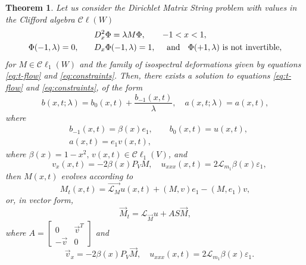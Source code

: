\documentclass[10pt,a4paper]{article}
\numberwithin{equation}{section}
\theoremstyle{plain}
\newtheorem{theorem}{Theorem}[section]
\theoremstyle{definition}
\renewcommand{\epsilon}{\varepsilon}
\newcommand\Cl{\mathcal{C}\ell}
\newcommand{\InMf}{\stackrel{\rightarrow}{\mathcal{L}_{M}}}
\renewcommand{\l}{\lambda}
\begin{document}
\begin{theorem}
Let us consider the Dirichlet Matrix String problem with values in the Clifford algebra $\Cl(W)$
\begin{align} 
&D_x^2 \Phi=\lambda M \Phi, \qquad   -1<x<1,  \\
\Phi(-1, \l)=0,  \qquad& D_x \Phi(-1, \l)=1, \quad  \text{ and \hspace{0.1cm} $\Phi(+1,\lambda)$ is not invertible}, 
\end{align} 
for $M\in \Cl_1(W)$ and the family of isospectral deformations given by equations \eqref{eq:t-flow} and 
\eqref{eq:constraints}.  Then, there exists a solution to equations \eqref{eq:t-flow} and 
\eqref{eq:constraints}, of the form  
\begin{equation} \label{eq:EBbis}
b(x,t; \lambda)=b_0(x,t)+\frac{b_{-1}(x,t)}{\lambda}, \quad a(x,t; \lambda)=a(x,t), 
\end{equation} 
where 
\begin{align}
&b_{-1}(x,t)=\beta(x) e_1, \qquad b_0(x,t)=u(x,t),\\
&      a(x,t)=e_1 v(x,t), \hspace{3cm}
\end{align}
where $\beta(x)=1-x^2,\,  v(x,t)\in \Cl_1(V)$, and 
\begin{equation} \label{eq:vx,uxxx bis}
 \quad v_x(x,t)=-2\beta(x)P_V M, \quad u_{xxx}(x,t)=2\mathcal{L}_{m_1}\beta(x) \epsilon_1, 
\end{equation} 
then $M(x,t)$ evolves according to 
\begin{equation} \label{eq:Cliffbeambis}
M_t(x,t)=\InMf u(x,t)+(M,v)e_1-(M, e_1)v, 
\end{equation} 
or, in vector form, 
\begin{equation} \label{eq:VCliffbis}
\vec{M}_t=\mathcal{L}_{\vec{M}} u+AS\vec{M}, 
\end{equation} 
where $A=\begin{bmatrix} 0&\vec{v}^T\\-\vec{v}&0 \end{bmatrix}$ and 
\begin{equation} \label{eq:Vconstraints} 
\quad \vec{v}_x=-2\beta(x)P_V \vec{M}, \quad u_{xxx}(x,t)=2\mathcal{L}_{m_1}\beta(x) \epsilon_1. 
\end{equation}
\end{theorem} 
\end{document}
